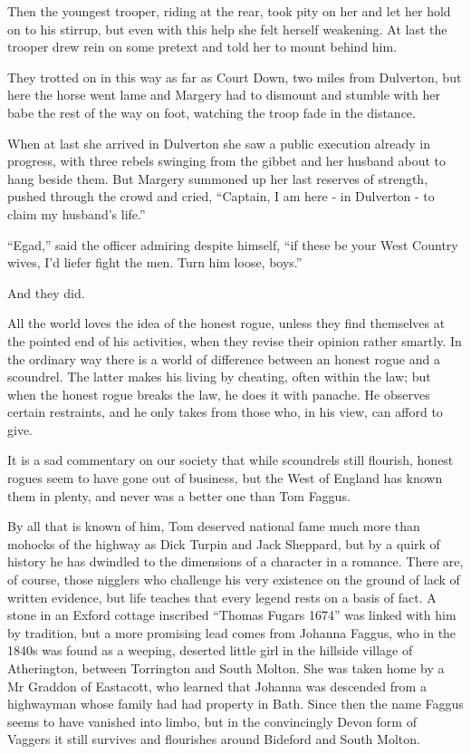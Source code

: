 Then the youngest trooper, riding at the rear, took pity on her and let her hold on to his stirrup, but even with this help she felt herself weakening. At last the trooper drew rein on some pretext and told her to mount behind him.

They trotted on in this way as far as Court Down, two miles from Dulverton, but here the horse went lame and Margery had to dismount and stumble with her babe the rest of the way on foot, watching the troop fade in the distance.

When at last she arrived in Dulverton she saw a public execution already in progress, with three rebels swinging from the gibbet and her husband about to hang beside them. But Margery summoned up her last reserves of strength, pushed through the crowd and cried, “Captain, I am here - in Dulverton - to claim my husband’s life.”

 “Egad,” said the officer admiring despite himself, “if these be your West Country wives, I’d liefer fight the men. Turn him loose, boys.”

 And they did.


All the world loves the idea of the honest rogue, unless they find themselves at the pointed end of his activities, when they revise their opinion rather smartly. In the ordinary way there is a world of difference between an honest rogue and a scoundrel. The latter makes his living by cheating, often within the law; but when the honest rogue breaks the law, he does it with panache. He observes certain restraints, and he only takes from those who, in his view, can afford to give.

It is a sad commentary on our society that while scoundrels still flourish, honest rogues seem to have gone out of business, but the West of England has known them in plenty, and never was a better one than Tom Faggus.

By all that is known of him, Tom deserved national fame much more than mohocks of the highway as Dick Turpin and Jack Sheppard, but by a quirk of history he has dwindled to the dimensions of a character in a romance. There are, of course, those nigglers who challenge his very existence on the ground of lack of written evidence, but life teaches that every legend rests on a basis of fact. A stone in an Exford cottage inscribed “Thomas Fugars 1674” was linked with him by tradition, but a more promising lead comes from Johanna Faggus, who in the 1840s was found as a weeping, deserted little girl in the hillside village of Atherington, between Torrington and South Molton. She was taken home by a Mr Graddon of Eastacott, who learned that Johanna was descended from a highwayman whose family had had property in Bath. Since then the name Faggus seems to have vanished into limbo, but in the convincingly Devon form of Vaggers it still survives and flourishes around Bideford and South Molton.

